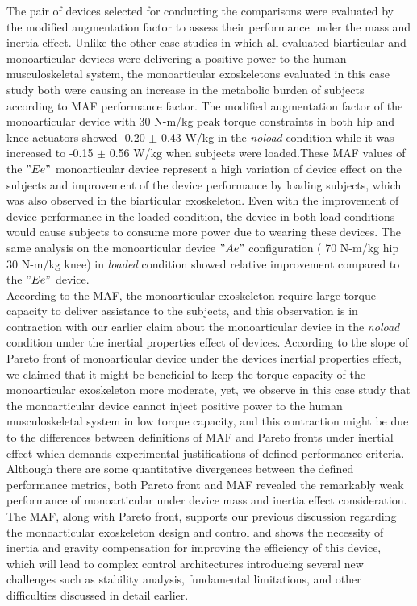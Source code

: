 \documentclass[10pt,letterpaper]{article}
\begin{document}
The pair of devices selected for conducting the comparisons were evaluated by the modified augmentation factor to assess their performance under the mass and inertia effect. Unlike the other case studies in which all evaluated biarticular and monoarticular devices were delivering a positive power to the human musculoskeletal system, the monoarticular exoskeletons evaluated in this case study both were causing an increase in the metabolic burden of subjects according to MAF performance factor. The modified augmentation factor of the monoarticular device with 30 N-m/kg peak torque constraints in both hip and knee actuators showed -0.20 $\pm$ 0.43 W/kg in the {\it noload} condition while it was increased to -0.15 $\pm$ 0.56 W/kg when subjects were loaded.These MAF values of the $"Ee"$ monoarticular device represent a high variation of device effect on the subjects and improvement of the device performance by loading subjects, which was also observed in the biarticular exoskeleton. Even with the improvement of device performance in the loaded condition, the device in both load conditions would cause subjects to consume more power due to wearing these devices. The same analysis on the monoarticular device $"Ae"$ configuration ( 70  N-m/kg hip 30 N-m/kg knee) in  {\it loaded} condition showed relative improvement compared to the $"Ee"$ device.\\
According to the MAF, the monoarticular exoskeleton require large torque capacity to deliver assistance to the subjects, and this observation is in contraction with our earlier claim about the monoarticular device in the {\it noload}  condition under the inertial properties effect of devices. According to the slope of Pareto front of monoarticular device under the devices inertial properties effect, we claimed that it might be beneficial to keep the torque capacity of the monoarticular exoskeleton more moderate, yet, we observe in this case study that the monoarticular device cannot inject positive power to the human musculoskeletal system in low torque capacity, and this contraction might be due to the differences between definitions of MAF and Pareto fronts under inertial effect which demands experimental justifications of defined performance criteria.\\
Although there are some quantitative divergences between the defined performance metrics, both Pareto front and MAF revealed the remarkably weak performance of monoarticular under device mass and inertia effect consideration. The MAF, along with Pareto front, supports our previous discussion regarding the monoarticular exoskeleton design and control and shows the necessity of inertia and gravity compensation for improving the efficiency of this device, which will lead to complex control architectures introducing several new challenges such as stability analysis, fundamental limitations, and other difficulties discussed in detail earlier.\\
\end{document}
